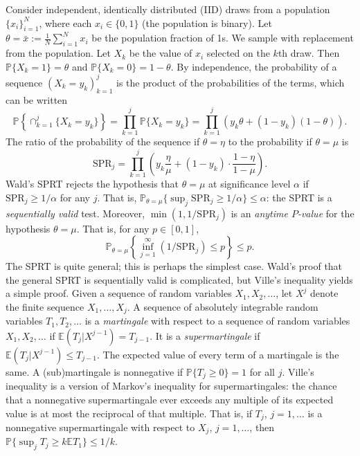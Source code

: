 \documentclass[12pt,runningheads]{llncs}
\newcommand{\EE}{\mathbb{E}}
\newcommand{\SPR}{\ensuremath{\mathrm{SPR}}}
\renewcommand{\Pr}{\mathbb{P}}
\begin{document}
{Consider independent, identically distributed (IID) draws from a population $\{x_i\}_{i=1}^N$, 
where each $x_i \in \{0, 1\}$ (the population is binary).
Let $\theta = \bar{x} := \frac{1}{N} \sum_{i=1}^N x_i$ be the population fraction of 1s.
We sample with replacement from the population.
Let $X_k$ be the value of $x_i$ selected on the $k$th draw. 
Then $\Pr \{X_k = 1 \} = \theta$ and $\Pr \{X_k = 0 \} = 1-\theta$.
By independence, the probability of a sequence $(X_k=y_k)_{k=1}^j$ is the product of the probabilities of the terms,
which can be written 
\begin{equation}
\Pr \left \{ \cap_{k=1}^j \{X_k = y_k \} \right \}= \prod_{k=1}^j \Pr \{X_k = y_k\} = \prod_{k=1}^j \left ( y_k \theta + (1-y_k)(1-\theta) \right ).
\end{equation}
The ratio of the probability of the sequence if $\theta = \eta$ to the probability if $\theta = \mu$ is
\begin{equation}
  \SPR_j = \prod_{k=1}^j \left ( y_k \frac{\eta}{\mu} + (1-y_k) \cdot \frac{1-\eta}{1-\mu} \right ).
\end{equation}
Wald's SPRT rejects the hypothesis that $\theta = \mu$ at significance level $\alpha$ if
$\SPR_j \ge 1/\alpha$ for any $j$.
That is, $\Pr_{\theta = \mu} \{\sup_j \SPR_j \ge 1/\alpha \} \le \alpha$: the SPRT is a \emph{sequentially valid} test.
Moreover, $\min(1, 1/\SPR_j)$ is an \emph{anytime $P$-value} for the hypothesis $\theta = \mu$.
That is, for any $p \in [0, 1]$, 
$$\Pr_{\theta = \mu}  \left \{\inf_{j=1}^\infty (1/\SPR_j) \le p \right \} \le p.$$
The SPRT is quite general; this is perhaps the simplest case.
Wald's proof that the general SPRT is sequentially valid is complicated, but Ville's inequality \cite{ville39} yields a simple proof.
Given a sequence of random variables $X_1, X_2, \ldots$, let $X^j$ denote the finite sequence $X_1, \ldots, X_j$.
A sequence of absolutely integrable random variables $T_1, T_2, \ldots$ is a \emph{martingale} with respect to a sequence of
random variables $X_1, X_2, \ldots$ if $\EE (T_j | X^{j-1}) = T_{j-1}$.
It is a \emph{supermartingale} if $\EE (T_j | X^{j-1}) \le T_{j-1}$.
The expected value of every term of a martingale is the same.
A (sub)martingale is nonnegative if $\Pr \{T_j \ge 0 \} = 1$ for all $j$.
Ville's inequality is a version of Markov's inequality for supermartingales:
the chance that a nonnegative supermartingale ever exceeds any multiple of its expected value is at most the reciprocal of that multiple.
That is, if $T_j$, $j=1, \ldots$ is a nonnegative supermartingale with respect to $X_j$, $j=1, \ldots$, then 
$\Pr \{ \sup_j T_j \ge k\EE T_1\} \le 1/k$.

}
\end{document}
